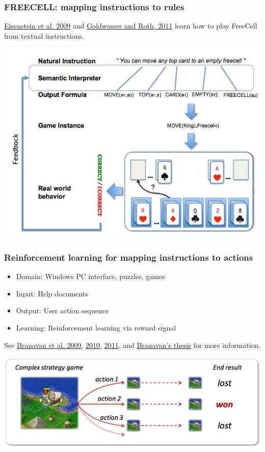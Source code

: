 \documentclass[ignorenonframetext]{beamer}
\begin{document}
\begin{frame}\frametitle{FREECELL: mapping instructions to rules}
\href{http://www.newdesign.aclweb.org/anthology/D/D09/D09-1100.pdf}{Eisenstein et al. 2009} and
\href{http://dan-goldwasser.com/publications/ijcai2011.pdf}{Goldwasser and Roth, 2011} 
learn how to play FreeCell from textual instructions.
\begin{center}
\href{http://dan-goldwasser.com/publications/ijcai2011.pdf}{
\includegraphics[width=.8\textwidth]{images/roth-freecell.png}}
\end{center}
\end{frame}

\begin{frame}\frametitle{Reinforcement learning for mapping instructions to actions}
\begin{itemize}
\item Domain: Windows PC interface, puzzles, games
\item Input: Help documents
\item Output: User action sequence
\item Learning: Reinforcement learning via reward signal
\end{itemize}
See \href{http://groups.csail.mit.edu/rbg/code/rl}{Branavan et al. 2009},
\href{http://groups.csail.mit.edu/rbg/code/rl-hli}{2010},
\href{http://groups.csail.mit.edu/rbg/code/civ}{2011}, and
\href{http://people.csail.mit.edu/branavan}{Branavan's thesis}
for more information.
\begin{center}
\href{http://groups.csail.mit.edu/rbg/code/civ}{
\includegraphics[width=\textwidth]{images/branavan-civ2.png}}
\end{center}
\end{frame}
\end{document}
